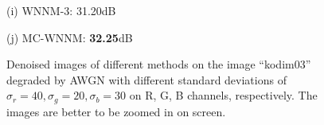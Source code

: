 \documentclass[10pt,onecolumn,letterpaper]{article}
\begin{document}
\begin{figure}[!htbp]
{\begin{minipage}[t]{0.24\textwidth}
{\footnotesize (i) WNNM-3: 31.20dB }
\end{minipage}
\begin{minipage}[t]{0.24\textwidth}
\centering
{}
{\footnotesize (j) MC-WNNM: \textbf{32.25}dB}
\end{minipage}
}
\caption{Denoised images of different methods on the image ``kodim03'' degraded by AWGN with different standard deviations of $\sigma_{r}=40, \sigma_{g}=20, \sigma_{b}=30$ on R, G, B channels, respectively. The images are better to be zoomed in on screen.}
\label{f2}
\end{figure}
\end{document}
